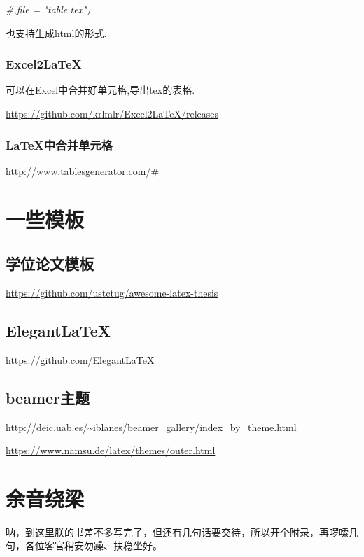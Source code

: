 \documentclass[]{ctexbook}
\newenvironment{Shaded}{\begin{snugshade}}{\end{snugshade}}
\newcommand{\CommentTok}[1]{\textcolor[rgb]{0.56,0.35,0.01}{\textit{#1}}}
\begin{document}
\begin{Shaded}
\begin{Highlighting}[]
    \CommentTok{#,file = "table.tex")}
\end{Highlighting}
\end{Shaded}

也支持生成html的形式.

\hypertarget{excel2latex}{%
\subsection{Excel2LaTeX}\label{excel2latex}}

可以在Excel中合并好单元格,导出tex的表格.

\url{https://github.com/krlmlr/Excel2LaTeX/releases}

\hypertarget{latex}{%
\subsection{LaTeX中合并单元格}\label{latex}}

\url{http://www.tablesgenerator.com/\#}

\hypertarget{section-18}{%
\chapter{一些模板}\label{section-18}}

\hypertarget{section-19}{%
\section{学位论文模板}\label{section-19}}

\url{https://github.com/ustctug/awesome-latex-thesis}

\hypertarget{elegantlatex}{%
\section{ElegantLaTeX}\label{elegantlatex}}

\url{https://github.com/ElegantLaTeX}

\hypertarget{beamer}{%
\section{beamer主题}\label{beamer}}

\url{http://deic.uab.es/~iblanes/beamer_gallery/index_by_theme.html}

\url{https://www.namsu.de/latex/themes/outer.html}

\cleardoublepage

\hypertarget{appendix-}{%
\appendix {}}


\hypertarget{sound}{%
\chapter{余音绕梁}\label{sound}}

呐，到这里朕的书差不多写完了，但还有几句话要交待，所以开个附录，再啰嗦几句，各位客官稍安勿躁、扶稳坐好。



\backmatter
\printindex
\end{document}
